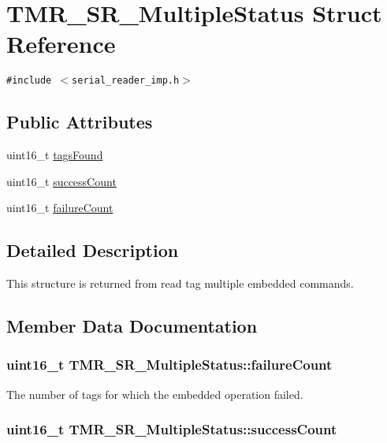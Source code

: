 \hypertarget{struct_t_m_r___s_r___multiple_status}{
\section{TMR\_\-SR\_\-MultipleStatus Struct Reference}
\label{struct_t_m_r___s_r___multiple_status}
}
{\tt \#include $<$serial\_\-reader\_\-imp.h$>$}

\subsection*{Public Attributes}
\begin{CompactItemize}
\item 
uint16\_\-t \hyperlink{struct_t_m_r___s_r___multiple_status_262a33ff5eaeeca63b18a6f36ac0f75e}{tagsFound}
\item 
uint16\_\-t \hyperlink{struct_t_m_r___s_r___multiple_status_8e2be605c2be68cde6c412595cf0d14b}{successCount}
\item 
uint16\_\-t \hyperlink{struct_t_m_r___s_r___multiple_status_56432bd63e2d43b6ee3eef8e92fbe2f2}{failureCount}
\end{CompactItemize}


\subsection{Detailed Description}
This structure is returned from read tag multiple embedded commands. 

\subsection{Member Data Documentation}
\hypertarget{struct_t_m_r___s_r___multiple_status_56432bd63e2d43b6ee3eef8e92fbe2f2}{
\subsubsection[{failureCount}]{\setlength{\rightskip}{0pt plus 5cm}uint16\_\-t {\bf TMR\_\-SR\_\-MultipleStatus::failureCount}}}
\label{struct_t_m_r___s_r___multiple_status_56432bd63e2d43b6ee3eef8e92fbe2f2}


The number of tags for which the embedded operation failed. \hypertarget{struct_t_m_r___s_r___multiple_status_8e2be605c2be68cde6c412595cf0d14b}{
\subsubsection[{successCount}]{\setlength{\rightskip}{0pt plus 5cm}uint16\_\-t {\bf TMR\_\-SR\_\-MultipleStatus::successCount}}}
\label{struct_t_m_r___s_r___multiple_status_8e2be605c2be68cde6c412595cf0d14b}


